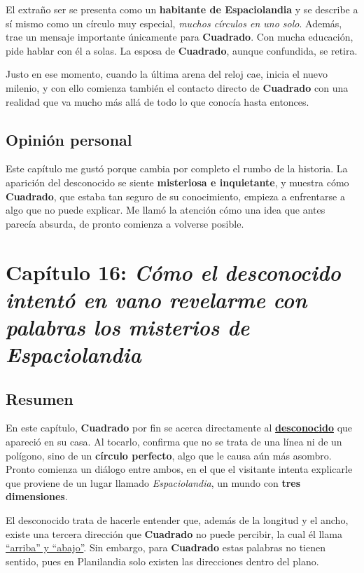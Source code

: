 \documentclass{article}
\begin{document}
El extraño ser se presenta como un \textbf{habitante de Espaciolandia} y se describe a sí mismo como un círculo muy especial, \emph{muchos círculos en uno solo}. Además, trae un mensaje importante únicamente para \textbf{Cuadrado}. Con mucha educación, pide hablar con él a solas. La esposa de \textbf{Cuadrado}, aunque confundida, se retira.

Justo en ese momento, cuando la última arena del reloj cae, inicia el nuevo milenio, y con ello comienza también el contacto directo de \textbf{Cuadrado} con una realidad que va mucho más allá de todo lo que conocía hasta entonces.

\subsection*{Opinión personal}

Este capítulo me gustó porque cambia por completo el rumbo de la historia. La aparición del desconocido se siente \textbf{misteriosa e inquietante}, y muestra cómo \textbf{Cuadrado}, que estaba tan seguro de su conocimiento, empieza a enfrentarse a algo que no puede explicar. Me llamó la atención cómo una idea que antes parecía absurda, de pronto comienza a volverse posible.


\section*{\textcolor{Victoria}{Capítulo 16: \emph{Cómo el desconocido intentó en vano revelarme con palabras los misterios de Espaciolandia}}}

\subsection*{Resumen}

En este capítulo, \textbf{Cuadrado} por fin se acerca directamente al \underline{\textbf{desconocido}} que apareció en su casa. Al tocarlo, confirma que no se trata de una línea ni de un polígono, sino de un \textbf{círculo perfecto}, algo que le causa aún más asombro. Pronto comienza un diálogo entre ambos, en el que el visitante intenta explicarle que proviene de un lugar llamado 
\emph{Espaciolandia}, un mundo con \textbf{tres dimensiones}.

El desconocido trata de hacerle entender que, además de la longitud y el ancho, existe una tercera dirección que \textbf{Cuadrado} no puede percibir, la cual él llama \underline{“arriba” y “abajo”}. Sin embargo, para \textbf{Cuadrado} estas palabras no tienen sentido, pues en Planilandia solo existen las direcciones dentro del plano.
\end{document}
